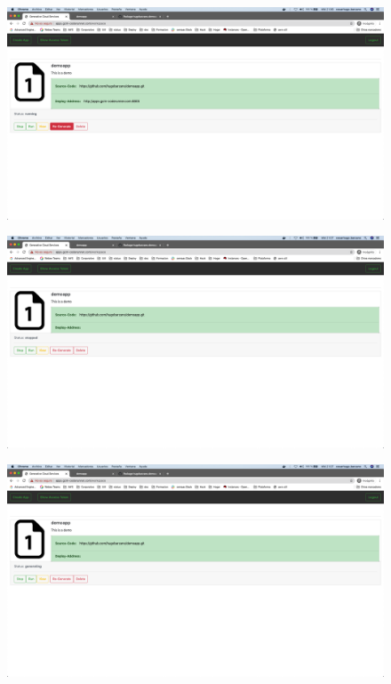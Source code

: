 \documentclass[a4paper,11pt]{book}
\begin{document}
   \begin{figure}[H]
\centering
\includegraphics[scale=0.2]{imagenes/casouso/4_1.png}
\caption{   }
\end{figure}


   \begin{figure}[H]
\centering
\includegraphics[scale=0.2]{imagenes/casouso/4_2.png}
\caption{   }
\end{figure}


   \begin{figure}[H]
\centering
\includegraphics[scale=0.2]{imagenes/casouso/4_3.png}
\caption{   }
\end{figure}
\end{document}
